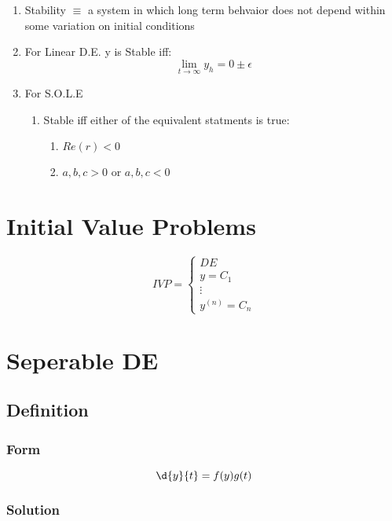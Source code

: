 \documentclass[11pt]{article}
\begin{document}
\begin{enumerate}
\item Stability $\equiv$ a system in which long term behvaior does not
      depend within some variation on initial conditions
\item For Linear D.E. y is Stable iff:
    \begin{equation}
    \lim_{t\rightarrow \infty} y_h = 0 \pm \epsilon
    \end{equation}
\item For S.O.L.E
\begin{enumerate}
\item Stable iff either of the equivalent statments is true:
\begin{enumerate}
\item $Re(r) < 0$
\item $a,b,c >0$ or $a,b,c <0$
\end{enumerate}
\end{enumerate}
\end{enumerate}
\section{Initial Value Problems}
\label{sec-4}

  \begin{equation}
  IVP = \left \{
  \begin{array}{lr}
  DE\\
  y = C_1\\
  \vdots\\
  y^{(n)} = C_n
  \end{array}
  \right.
  \end{equation}

\section{Seperable DE}
\label{sec-5}
\subsection{Definition}
\label{sec-5-1}
\subsubsection{Form}
\label{sec-5-1-1}

    \begin{equation}
    \d{y}{t}=f(y)g(t)
    \end{equation}
\subsubsection{Solution}
\label{sec-5-1-2}
\end{document}
